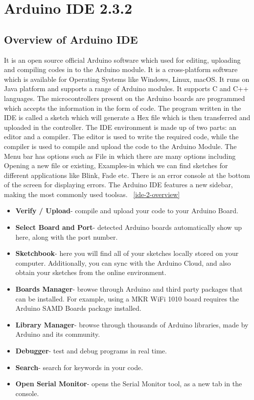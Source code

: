 \chapter{Arduino IDE 2.3.2}
\section{Overview of Arduino IDE}

It is an open source official Arduino software which used for editing, uploading and compiling codes in to the Arduino module. It is a cross-platform software which is available for Operating Systems like Windows, Linux, macOS. It runs on Java platform and supports a range of Arduino modules. It supports C and C++ languages. The microcontrollers present on the Arduino boards are programmed which accepts the information in the form of code. The program written in the IDE is called a sketch which will generate a Hex file which is then transferred and uploaded in the controller. The IDE environment is made up of two parts: an editor and a compiler. The editor is used to write the required code, while the compiler is used to compile and upload the code to the Arduino Module. The Menu bar has options such as File in which there are many options including Opening a new file or existing, Examples-in which we can find sketches for different applications like Blink, Fade etc. There is an error console at the bottom of the screen for displaying errors. The Arduino IDE features a new sidebar, making the most commonly used toolsas. ~\ref{ide-2-overview} \cite{arduinodescription:2024} \cite{arduino_ide_environment:2025}


\begin{itemize}
	\item \textbf{Verify / Upload}- compile and upload your code to your Arduino Board.
	\item \textbf{Select Board and Port}- detected Arduino boards automatically show up here, along with the port number.
	\item \textbf{Sketchbook}- here you will find all of your sketches locally stored on your computer. Additionally, you can sync with the Arduino Cloud, and also obtain your sketches from the online environment.
	\item \textbf{Boards Manager}- browse through Arduino and third party packages that can be installed. For example, using a MKR WiFi 1010 board requires the Arduino SAMD Boards package installed.
	\item \textbf{Library Manager}- browse through thousands of Arduino libraries, made by Arduino and its community.
	\item \textbf{Debugger}- test and debug programs in real time.
	\item \textbf{Search}- search for keywords in your code.
	\item \textbf{Open Serial Monitor}- opens the Serial Monitor tool, as a new tab in the console.
\end{itemize}

